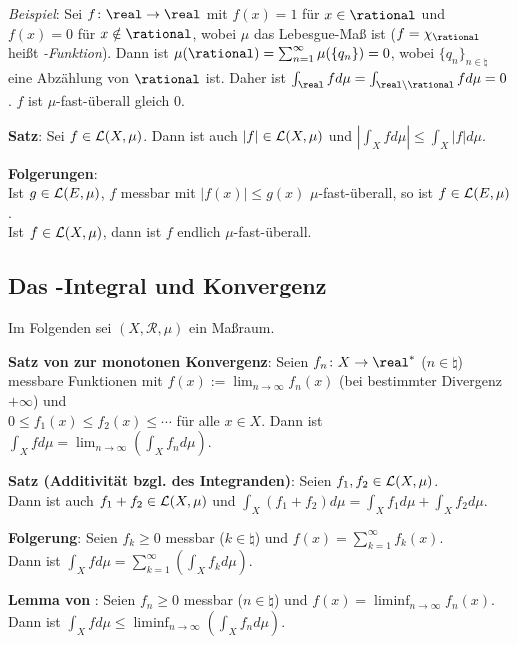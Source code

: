 \emph{Beispiel}:
Sei $f\colon \real \rightarrow \real$ mit $f(x) = 1$ für $x \in \rational$
und $f(x) = 0$ für $x \notin \rational$, wobei
$\mu$ das Lebesgue-Maß ist
($f = \chi_\rational$ heißt \emph{-Funktion}).
Dann ist $\mu(\rational) = \sum_{n=1}^\infty \mu(\{q_n\}) = 0$, wobei
$\{q_n\}_{n \in \natural}$ eine Abzählung von $\rational$ ist.
Daher ist $\int_\real f d\mu = \int_{\real \setminus \rational} f d\mu = 0$.
$f$ ist $\mu$-fast-überall gleich $0$.

\textbf{Satz}:
Sei $f \in \mathcal{L}(X, \mu)$.
Dann ist auch $|f| \in \mathcal{L}(X, \mu)$ und
$\left|\int_X f d\mu\right| \le \int_X |f| d\mu$.

\textbf{Folgerungen}: \\
Ist $g \in \mathcal{L}(E, \mu)$, $f$ messbar mit $|f(x)| \le g(x)$ $\mu$-fast-überall,
so ist $f \in \mathcal{L}(E, \mu)$. \\
Ist $f \in \mathcal{L}(X, \mu)$, dann ist $f$ endlich $\mu$-fast-überall.

\pagebreak

\subsection{%
    Das -Integral und Konvergenz%
}

Im Folgenden sei $(X, \mathcal{R}, \mu)$ ein Maßraum.

\textbf{Satz von  zur monotonen Konvergenz}:
Seien $f_n\colon X \rightarrow \real^\ast$ ($n \in \natural$)
messbare Funktionen mit
$f(x) := \lim_{n \to \infty} f_n(x)$
(bei bestimmter Divergenz $+\infty$) und \\
$0 \le f_1(x) \le f_2(x) \le \dotsb$ für alle $x \in X$.
Dann ist $\int_X f d\mu = \lim_{n \to \infty} \left(\int_X f_n d\mu\right)$.

\textbf{Satz (Additivität bzgl. des Integranden)}:
Seien $f_1, f_2 \in \mathcal{L}(X, \mu)$. \\
Dann ist auch $f_1 + f_2 \in \mathcal{L}(X, \mu)$ und
$\int_X (f_1 + f_2) d\mu = \int_X f_1 d\mu + \int_X f_2 d\mu$.

\textbf{Folgerung}:
Seien $f_k \ge 0$ messbar ($k \in \natural$)
und $f(x) = \sum_{k=1}^\infty f_k(x)$. \\
Dann ist $\int_X f d\mu = \sum_{k=1}^\infty \left(\int_X f_k d\mu\right)$.

\textbf{Lemma von }:
Seien $f_n \ge 0$ messbar ($n \in \natural$) und
$f(x) = \liminf_{n \to \infty} f_n(x)$. \\
Dann ist $\int_X f d\mu \le
\liminf_{n \to \infty} \left(\int_X f_n d\mu\right)$.

